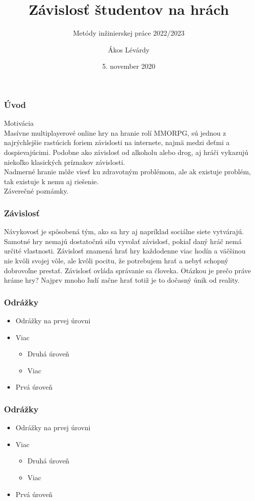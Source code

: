 \documentclass{beamer}
\author{Ákos Lévárdy}
\institute{
	Ústav informatiky, informačných systémov a softvérového inžinierstva\\
	Fakulta informatiky a informačných technológií\\
	Slovenská technická univerzita v Bratislave}
\subtitle{\vspace{3mm} Metódy inžinierskej práce 2022/2023}
\title{Závislosť študentov na hrách}
\date{\footnotesize 5. november 2020}
\begin{document}
\begin{frame}[fragile=singleslide]
\titlepage
\end{frame}

\begin{frame}[fragile=singleslide]\frametitle{Úvod}
Motivácia\\
Masívne multiplayerové online hry na hranie rolí MMORPG, sú jednou z najrýchlejšie rastúcich foriem závislosti na internete, najmä medzi deťmi a dospievajúcimi. Podobne ako závislosť od alkoholu alebo drog, aj hráči vykazujú niekoľko klasických príznakov závislosti.\\
Nadmerné hranie môže viesť ku zdravotným problémom, ale ak existuje problém, tak existuje k nemu aj riešenie.\\
Záverečné poznámky.
\end{frame}

\begin{frame}[fragile=singleslide]\frametitle{Závislosť}
\tableofcontents
Návykovosť je spôsobená tým, ako sa hry aj napríklad sociálne siete vytvárajú. 
Samotné hry nemajú dostatočnú silu vyvolať závislosť, pokiaľ daný hráč nemá určité vlastnosti. 
Závislosť znamená hrať hry každodenne viac hodín a väčšinou nie kvôli svojej vôle, ale kvôli pocitu, že potrebujem hrať a nebyť schopný dobrovoľne prestať. Závislosť ovláda správanie sa človeka. Otázkou je prečo práve hráme hry? Najprv mnoho ľudí začne hrať totiž je to dočasný únik od reality. 
\end{frame}

\begin{frame}[fragile=singleslide]\frametitle{Odrážky}
\begin{itemize}
\item Odrážky na prvej úrovni
\item Viac
	\begin{itemize}
	\item Druhá úroveň
	\item Viac
	\end{itemize}
\item Prvá úroveň
\end{itemize}
\end{frame}

\begin{frame}[fragile=singleslide]\frametitle{Odrážky}
\begin{itemize}
\item Odrážky na prvej úrovni
\item Viac
	\begin{itemize}
	\item Druhá úroveň
	\item Viac
	\end{itemize}
\item Prvá úroveň
\end{itemize}
\end{frame}
\end{document}
